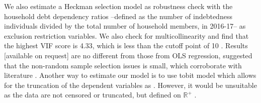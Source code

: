 \documentclass[a4paper, 11pt, onecolumn]{article}
\newcommand{\PTCS}{PT\&CS}
\begin{document}
We also estimate a Heckman selection model as robustness check with the household debt dependency ratios --defined as the number of indebtedness individuals divided by the total number of household members, in 2016-17-- as exclusion restriction variables.
We also check for multicollinearity and find that the highest VIF score is 4.33, which is less than the cutoff point of 10 \citep{Lennox2011}.
Results [available on request] are no different from those from OLS regression, suggested that the non-random sample selection issues is small, which corroborate with literature \citep{Rio2006, Brown2014}.
Another way to estimate our model is to use tobit model which allows for the truncation of the dependent variables as \cite{Brown2014, Cox1993}.
However, it would be unsuitable as the data are not censored or truncated, but defined on $\mathbb{R}^{+}$ \citep{Maddala1991}.


\end{document}
